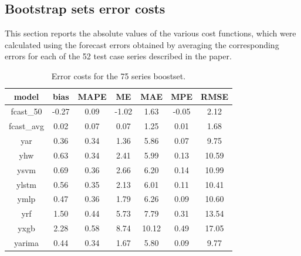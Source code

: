 \documentclass[poms,final,nonblindrev]{poms1_V1} %
\begin{document}
%
\begin{APPENDIX}{}
\section{Bootstrap sets error costs} \label{app:errcost}

This section reports the absolute values of the various cost functions, which were calculated using the forecast errors obtained by averaging the corresponding errors for each of the 52 test case series described in the paper.

\begin{table}[h]
	\centering
	\renewcommand{\arraystretch}{0.8}
	\begin{tabular}{ccccccc}
		model & bias & MAPE & ME & MAE & MPE & RMSE \\
		\hline
		fcast\_50   &-0.27 & 0.09 &-1.02 & 1.63 &-0.05 &  2.12 \\
		fcast\_avg  & 0.02 & 0.07 & 0.07 & 1.25 & 0.01 &  1.68 \\
		yar         & 0.36 & 0.34 & 1.36 & 5.86 & 0.07 &  9.75 \\
		yhw         & 0.63 & 0.34 & 2.41 & 5.99 & 0.13 & 10.59 \\
		ysvm        & 0.69 & 0.36 & 2.66 & 6.20 & 0.14 & 10.99 \\
		ylstm       & 0.56 & 0.35 & 2.13 & 6.01 & 0.11 & 10.41 \\
		ymlp        & 0.47 & 0.36 & 1.79 & 6.26 & 0.09 & 10.60 \\
		yrf         & 1.50 & 0.44 & 5.73 & 7.79 & 0.31 & 13.54 \\
		yxgb        & 2.28 & 0.58 & 8.74 &10.12 & 0.49 & 17.05 \\
		yarima      & 0.44 & 0.34 & 1.67 & 5.80 & 0.09 &  9.77 \\
		\hline
	\end{tabular}
	\caption{Error costs for the 75 series boostset.}
	\label{table:app75}
\end{table}


\end{APPENDIX}
\end{document}
